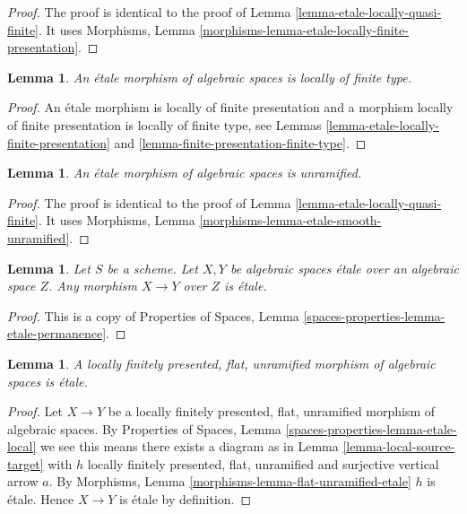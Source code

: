 \documentclass{stacks-project}
\theoremstyle{plain}
\newtheorem{lemma}[subsection]{Lemma}
\theoremstyle{definition}
\theoremstyle{remark}
\numberwithin{equation}{subsection}
\begin{document}
\begin{proof}
The proof is identical to the proof of
Lemma \ref{lemma-etale-locally-quasi-finite}.
It uses
Morphisms, Lemma \ref{morphisms-lemma-etale-locally-finite-presentation}.
\end{proof}

\begin{lemma}
\label{lemma-etale-locally-finite-type}
An \'etale morphism of algebraic spaces is locally of finite type.
\end{lemma}

\begin{proof}
An \'etale morphism is locally of finite presentation
and a morphism locally of finite presentation is locally of finite type,
see
Lemmas \ref{lemma-etale-locally-finite-presentation} and
\ref{lemma-finite-presentation-finite-type}.
\end{proof}

\begin{lemma}
\label{lemma-etale-unramified}
An \'etale morphism of algebraic spaces is unramified.
\end{lemma}

\begin{proof}
The proof is identical to the proof of
Lemma \ref{lemma-etale-locally-quasi-finite}.
It uses
Morphisms, Lemma \ref{morphisms-lemma-etale-smooth-unramified}.
\end{proof}

\begin{lemma}
\label{lemma-etale-permanence}
Let $S$ be a scheme. Let $X, Y$ be algebraic spaces \'etale over
an algebraic space $Z$. Any morphism $X \to Y$ over $Z$ is \'etale.
\end{lemma}

\begin{proof}
This is a copy of
Properties of Spaces, Lemma \ref{spaces-properties-lemma-etale-permanence}.
\end{proof}

\begin{lemma}
\label{lemma-unramified-flat-lfp-etale}
A locally finitely presented, flat, unramified morphism of algebraic
spaces is \'etale.
\end{lemma}

\begin{proof}
Let $X \to Y$ be a locally finitely presented, flat, unramified morphism
of algebraic spaces. By
Properties of Spaces, Lemma \ref{spaces-properties-lemma-etale-local}
we see this means there exists a diagram as in
Lemma \ref{lemma-local-source-target}
with $h$ locally finitely presented, flat, unramified
and surjective vertical arrow $a$. By
Morphisms, Lemma \ref{morphisms-lemma-flat-unramified-etale}
$h$ is \'etale. Hence $X \to Y$ is \'etale by definition.
\end{proof}
\end{document}
